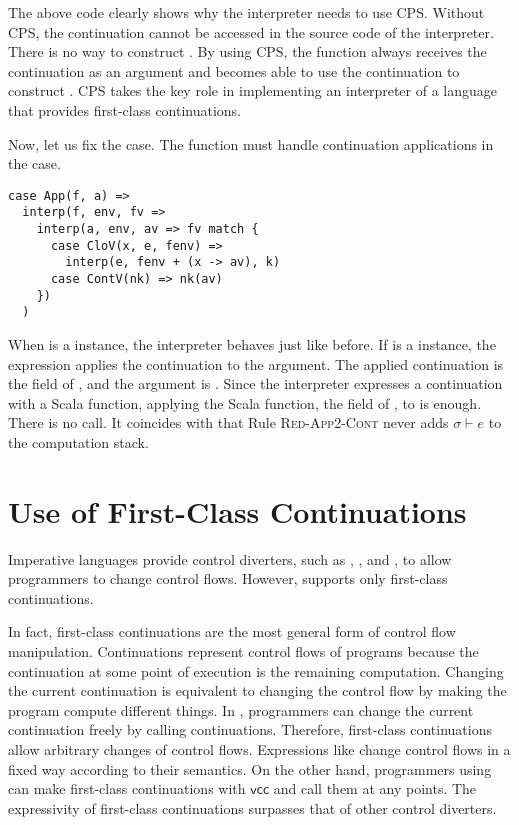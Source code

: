 The above code clearly shows why the interpreter needs to use CPS. Without CPS,
the continuation cannot be accessed in the source code of the interpreter. There
is no way to construct . By using CPS, the  function
always receives the continuation as an argument and becomes able to use the continuation to
construct . CPS takes the key role in implementing an interpreter of
a language that provides first-class continuations.

Now, let us fix the  case.
The  function must handle continuation applications in the
 case.

\begin{verbatim}
case App(f, a) =>
  interp(f, env, fv =>
    interp(a, env, av => fv match {
      case CloV(x, e, fenv) =>
        interp(e, fenv + (x -> av), k)
      case ContV(nk) => nk(av)
    })
  )
\end{verbatim}

When  is a  instance, the interpreter behaves just like before.
If  is a  instance, the expression applies the continuation
to the argument. The applied continuation is the field of , and the argument
is . Since the interpreter expresses a continuation with a Scala function,
applying the Scala function, the field of , to  is enough.
There is no  call. It coincides with that Rule \textsc{Red-App2-Cont}
never adds $\sigma\vdash e$ to the computation stack.

\section{Use of First-Class Continuations}

Imperative languages provide control diverters, such as ,
, and , to allow programmers to change control
flows. However, \lang supports only first-class continuations.

In fact, first-class continuations are the most general form of control flow
manipulation. Continuations represent control flows of programs because the
continuation at some point of execution is the remaining computation.
Changing the current continuation is equivalent to changing the control flow by
making the program compute different things.
In \lang, programmers can change the current
continuation freely by calling continuations. Therefore, first-class
continuations allow arbitrary changes of control flows.
Expressions like  change control flows in a fixed way according
to their semantics. On the other hand, programmers using \lang can make first-class
continuations with $\textsf{vcc}$ and call them at any points. The expressivity of
first-class continuations surpasses that of other control diverters.

